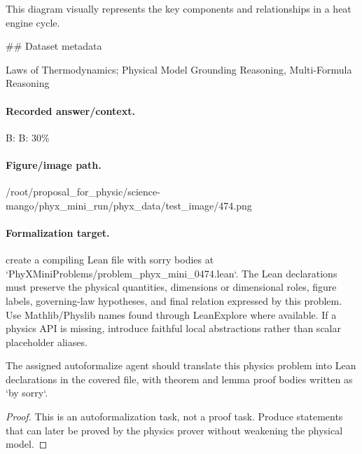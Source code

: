 This diagram visually represents the key components and relationships in a heat engine cycle.

\#\# Dataset metadata

Laws of Thermodynamics; Physical Model Grounding Reasoning, Multi-Formula Reasoning

\paragraph{Recorded answer/context.}
B: B: 30\%

\paragraph{Figure/image path.}
/root/proposal\_for\_physic/science-mango/phyx\_mini\_run/phyx\_data/test\_image/474.png

\paragraph{Formalization target.}
create a compiling Lean file with sorry bodies at `PhyXMiniProblems/problem\_phyx\_mini\_0474.lean`. The Lean declarations must preserve the physical quantities, dimensions or dimensional roles, figure labels, governing-law hypotheses, and final relation expressed by this problem.
Use Mathlib/Physlib names found through LeanExplore where available. If a physics API is missing, introduce faithful local abstractions rather than scalar placeholder aliases.

\begin{theorem}
\label{thm:physics:phyx_mini_0474:target}
The assigned autoformalize agent should translate this physics problem into Lean declarations in the covered file, with theorem and lemma proof bodies written as `by sorry`.
\end{theorem}
\begin{proof}
This is an autoformalization task, not a proof task. Produce statements that can later be proved by the physics prover without weakening the physical model.
\end{proof}

